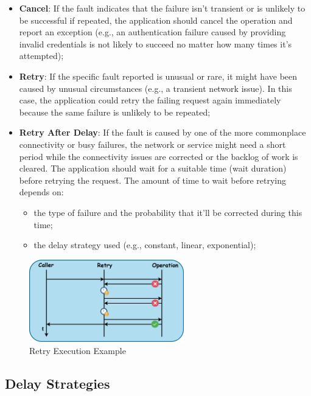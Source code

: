 \begin{itemize}
    \item \textbf{Cancel}: If the fault indicates that the failure isn't transient or is unlikely to be successful if repeated, the application should cancel the operation and report an exception (e.g., an authentication failure caused by providing invalid credentials is not likely to succeed no matter how many times it's attempted);
    \item \textbf{Retry}: If the specific fault reported is unusual or rare, it might have been caused by unusual circumstances (e.g., a transient network issue).
    In this case, the application could retry the failing request again immediately because the same failure is unlikely to be repeated;
    \item \textbf{Retry After Delay}: If the fault is caused by one of the more commonplace connectivity or busy failures, the network or service might need a short period while the connectivity issues are corrected or the backlog of work is cleared.
    The application should wait for a suitable time (wait duration) before retrying the request.
    The amount of time to wait before retrying depends on:
    \begin{itemize}
        \item the type of failure and the probability that it'll be corrected during this time;
        \item the delay strategy used (e.g., constant, linear, exponential);
    \end{itemize}
\end{itemize}

\begin{figure}[!htb]
    \centering
    \includegraphics[width=0.6\textwidth]{../figures/04_retry-execution-example}
    \caption{Retry Execution Example}
    \label{fig:retry-execution-example}
\end{figure}

\subsection{Delay Strategies}\label{subsec:retry-delay-strategies}

